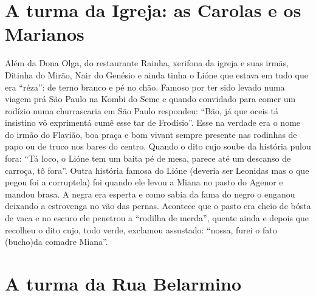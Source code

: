 \documentclass[12pt,brazil,]{book}
\begin{document}
\section{A turma da Igreja: as Carolas e os
Marianos}\label{a-turma-da-igreja-as-carolas-e-os-marianos}

Além da Dona Olga, do restaurante Rainha, xerifona da igreja e suas
irmãs, Ditinha do Mirão, Nair do Genésio e ainda tinha o Lióne que
estava em tudo que era ``réza'': de terno branco e pé no chão. Famoso
por ter sido levado numa viagem prá São Paulo na Kombi do Seme e quando
convidado para comer um rodízio numa churrascaria em São Paulo
respondeu: ``Bão, já que oceis tá insistino vô exprimentá cumê esse tar
de Frodísio''. Esse na verdade era o nome do irmão do Flavião, boa praça
e bom vivant sempre presente nas rodinhas de papo ou de truco nos bares
do centro. Quando o dito cujo soube da história pulou fora: ``Tá loco, o
Lióne tem um baita pé de mesa, parece até um descanso de carroça, tô
fora''. Outra história famosa do Lióne (deveria ser Leonidas mas o que
pegou foi a corruptela) foi quando ele levou a Miana no pasto do Agenor
e mandou brasa. A negra era esperta e como sabia da fama do negro o
enganou deixando a estrovenga no vão das pernas. Acontece que o pasto
era cheio de bósta de vaca e no escuro ele penetrou a ``rodilha de
merda'', quente ainda e depois que recolheu o dito cujo, todo verde,
exclamou assustado: ``nossa, furei o fato (bucho)da comadre Miana''.

\section{A turma da Rua Belarmino}\label{a-turma-da-rua-belarmino}
\end{document}
